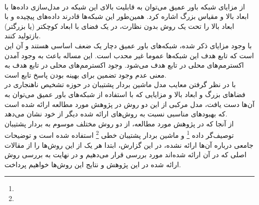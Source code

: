 \documentclass[twocolumn]{article}
\newcommand{\enfootnote}[1]{\footnote{\lr{#1}}}
\begin{document}
\\
از مزایای شبکه باور عمیق می‌توان به قابلیت بالای این شبکه در مدل‌سازی داده‌ها با ابعاد بالا و مقیاس بزرگ اشاره کرد. همین‌طور این شبکه‌ها قادرند داده‌های پیچیده و با ابعاد بالا را تحت یک روش بدون نظارت، در یک فضای با ابعاد کوچکتر (یا بزرگتر) بازتولید کنند.
\\
با وجود مزایای ذکر شده، شبکه‌های باور عمیق دچار یک ضعف اساسی هستند و آن این است که تابع هدف این شبکه‌ها عموما غیر محدب است. این مساله باعث به وجود آمدن اکسترمم‌های محلی در تابع هدف می‌شود. وجود اکسترمم‌های محلی در تابع هدف به معنی عدم وجود تضمین برای بهینه بودن پاسخ تابع است.
\\
با در نظر گرفتن معایب مدل ماشین بردار پشتیبان در حوزه تشخیص ناهنجاری در فضاهای بزرگ و ابعاد بالا و مزایایی که با استفاده از شبکه‌های باور عمیق می‌توان به آن‌ها دست یافت، مدل مرکبی از این دو روش در پژوهش مورد مطالعه ارائه شده است که بهبودهای مناسبی نسبت به روش‌های ارائه شده دیگر از خود نشان می‌دهد.
\\
از‌ آنجا که در پژوهش مورد مطالعه، از دو روش مختلف موسوم به بردار پشتیبان توصیف‌گر داده 
\enfootnote{SVDD}
\cite{tax2004support}
 و ماشین بردار پشتیبان خطی 
\enfootnote{PSVD}
\cite{scholkopf2001estimating}
 استفاده شده است و توضیحات جامعی درباره آن‌ها ارائه نشده، در این گزارش، ابتدا هر یک از این روش‌ها را از مقالات اصلی که در آن ارائه شده‌اند مورد بررسی قرار می‌دهیم و در نهایت به بررسی روش ارائه شده در این پژوهش و نتایج این روش‌ها خواهیم پرداخت.
\end{document}
